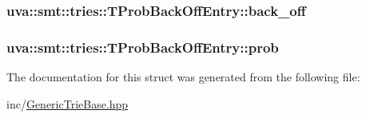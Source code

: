 \subsubsection[{back\+\_\+off}]{ uva\+::smt\+::tries\+::\+T\+Prob\+Back\+Off\+Entry\+::back\+\_\+off}\label{structuva_1_1smt_1_1tries_1_1_t_prob_back_off_entry_acd9e9871fbaf91450225855e5c510145}
\hypertarget{structuva_1_1smt_1_1tries_1_1_t_prob_back_off_entry_a214a33956ad703bd35a5aa83f99f7b92}{}
\subsubsection[{prob}]{ uva\+::smt\+::tries\+::\+T\+Prob\+Back\+Off\+Entry\+::prob}\label{structuva_1_1smt_1_1tries_1_1_t_prob_back_off_entry_a214a33956ad703bd35a5aa83f99f7b92}


The documentation for this struct was generated from the following file\+:\begin{DoxyCompactItemize}
\item 
inc/\hyperlink{_generic_trie_base_8hpp}{Generic\+Trie\+Base.\+hpp}\end{DoxyCompactItemize}
